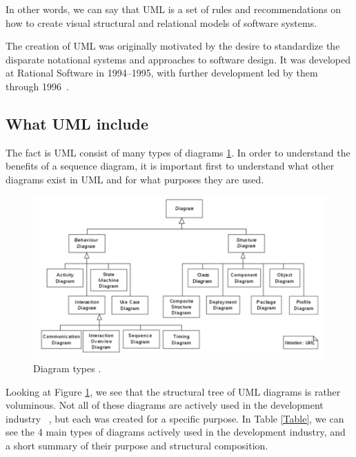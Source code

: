 \documentclass[10pt, twoside, slovak,a4paper]{article}
\begin{document}
In other words, we can say that UML is a set of rules and recommendations on how to create visual structural and relational models of software systems.

The creation of UML was originally motivated by the desire to standardize the disparate notational systems and approaches to software design. It was developed at Rational Software in 1994–1995, with further development led by them through 1996~\cite{UML_user_guide:Booch}.

\subsection{What UML include}

The fact is UML consist of many types of diagrams \ref{UML:diagrams}. In order to understand the benefits of a sequence diagram, it is important first to understand what other diagrams exist in UML and for what purposes they are used.

\begin{figure}[tbh]
	\centering
	\includegraphics[scale=0.5]{UML diagrams.png}
	\caption{Diagram types \cite{UML_user_guide:Booch}.}
	\label{UML:diagrams}
	\end{figure}

Looking at Figure \ref{UML:diagrams}, we see that the structural tree of UML diagrams is rather voluminous. Not all of these diagrams are actively used in the development industry ~\cite{UML_Distilled}, but each was created for a specific purpose. In Table \ref{Table}, we can see the 4 main types of diagrams actively used in the development industry, and a short summary of their purpose and structural composition.
\end{document}
